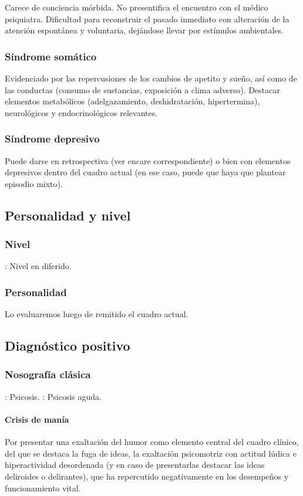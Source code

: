 Carece de conciencia mórbida. No presentifica el encuentro con el médico psiquiatra. Dificultad para reconstruir el pasado inmediato con alteración de la atención espontánea y voluntaria, dejándose llevar por estímulos ambientales.
\subsubsection*{Síndrome somático}
Evidenciado por las repercusiones de los cambios de apetito y sueño, así como de las conductas (consumo de sustancias, exposición a clima adverso). Destacar elementos metabólicos (adelgazamiento, deshidratación, hipertermina), neurológicos y endocrinológicos relevantes.
\subsubsection*{Síndrome depresivo}
Puede darse en retrospectiva (ver encare correspondiente) o bien con elementos depresivos dentro del cuadro actual (en ese caso, puede que haya que plantear episodio mixto).
\subsection*{Personalidad y nivel}
\subsubsection*{Nivel}
\faPaste: Nivel en diferido.
\subsubsection*{Personalidad}
Lo evaluaremos luego de remitido el cuadro actual.
\subsection*{Diagnóstico positivo}
\subsubsection*{Nosografía clásica}
\faPaste: Psicosis.
\faPaste: Psicosis aguda.
\paragraph{Crisis de manía}
Por presentar una exaltación del humor como elemento central del cuadro clínico, del que se destaca la fuga de ideas, la exaltación psicomotriz con actitud lúdica e hiperactividad desordenada (y en caso de presentarlas destacar las ideas deliroides o delirantes), que ha repercutido negativamente en los desempeños y funcionamiento vital.
